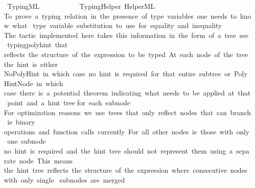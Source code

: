 %
\begin{isabellebody}%
%
%
\isadelimtheory
%
\endisadelimtheory
%
\isatagtheory
{}\isamarkupfalse%
\ TypingML\ \ \ \ \ \ \ \ \isanewline
\ \ \ TypingHelper\ HelperML\isanewline
{}%
\endisatagtheory
{\isafoldtheory}%
%
\isadelimtheory
\ \ \ \ \ \ \ \ \ \ \ \ \ \ \ \isanewline
%
\endisadelimtheory
%
\isadelimML
\isanewline
%
\endisadelimML
%
\isatagML
{}\isamarkupfalse%
\ {\isacartoucheopen}\isanewline
\isanewline
{\isacharparenleft}{\kern0pt}{\isacharasterisk}{\kern0pt}\isanewline
To\ prove\ a\ typing\ relation\ in\ the\ presence\ of\ type\ variables{\isacharcomma}{\kern0pt}\ one\ needs\ to\ know\ what\ \isanewline
type\ variable\ substitution\ to\ use\ for\ equality\ and\ inequality{\isachardot}{\kern0pt}\isanewline
The\ tactic\ implemented\ here\ takes\ this\ information\ in\ the\ form\ of\ a\ tree\ {\isacharparenleft}{\kern0pt}see\ typing{\isacharunderscore}{\kern0pt}poly{\isacharunderscore}{\kern0pt}hint{\isacharparenright}{\kern0pt}\ that\isanewline
reflects\ the\ structure\ of\ the\ expression\ to\ be\ typed{\isachardot}{\kern0pt}\ At\ each\ node\ of\ the\ tree{\isacharcomma}{\kern0pt}\ the\ hint\ is\ either\isanewline
NoPolyHint\ {\isacharparenleft}{\kern0pt}in\ which\ case\ no\ hint\ is\ required\ for\ that\ entire\ subtree{\isacharparenright}{\kern0pt}\ or\ PolyHintNode\ {\isacharparenleft}{\kern0pt}in\ which\isanewline
case\ there\ is\ a\ potential\ theorem\ indicating\ what\ needs\ to\ be\ applied\ at\ that\ point\ and\ a\ hint\ tree\isanewline
for\ each\ subnode{\isacharparenright}{\kern0pt}{\isachardot}{\kern0pt}\ \isanewline
For\ optimization\ reasons{\isacharcomma}{\kern0pt}\ we\ use\ trees\ that\ only\ reflect\ nodes\ that\ can\ branch\ {\isacharparenleft}{\kern0pt}i{\isachardot}{\kern0pt}e{\isachardot}{\kern0pt}{\isacharcomma}{\kern0pt}\ binary\isanewline
operations\ and\ function\ calls\ currently{\isacharparenright}{\kern0pt}{\isachardot}{\kern0pt}\ For\ all\ other\ nodes\ {\isacharparenleft}{\kern0pt}i{\isachardot}{\kern0pt}e{\isachardot}{\kern0pt}{\isacharcomma}{\kern0pt}\ those\ with\ only\ one\ subnode{\isacharparenright}{\kern0pt}\isanewline
no\ hint\ is\ required\ and\ the\ hint\ tree\ should\ not\ represent\ them\ using\ a\ separate\ node{\isachardot}{\kern0pt}\ This\ means\isanewline
the\ hint\ tree\ reflects\ the\ structure\ of\ the\ expression\ where\ consecutive\ nodes\ with\ only\ single\ \isanewline
subnodes\ are\ merged{\isachardot}{\kern0pt}\isanewline
{\isacharasterisk}{\kern0pt}{\isacharparenright}{\kern0pt}\isanewline

\end{isabellebody}
